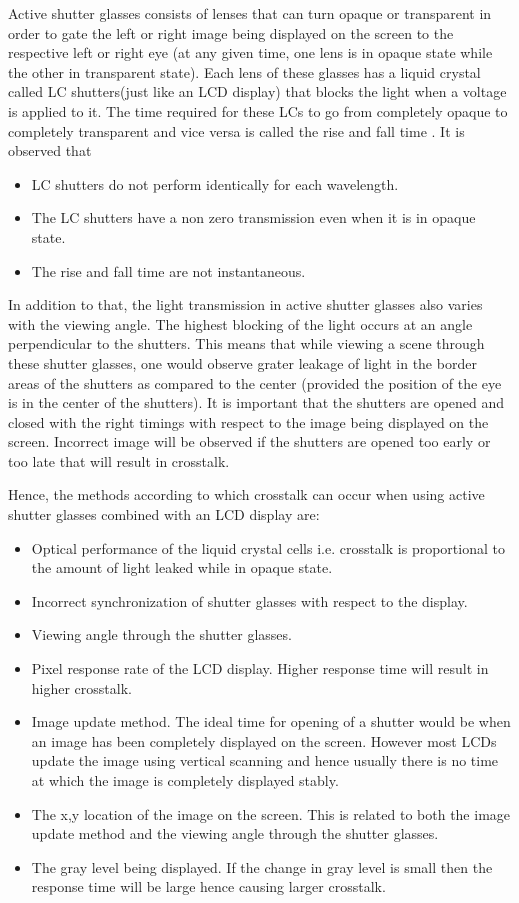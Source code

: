 Active shutter glasses consists of lenses that can turn opaque or transparent in order to gate the left or right image being displayed on the screen to the respective left or right eye (at any given time, one lens is in opaque state while the other in transparent state). Each lens of these glasses has a liquid crystal called LC shutters(just like an LCD display) that blocks the light when a voltage is applied to it. The time required for these LCs to go from completely opaque to completely transparent and vice versa is called the rise and fall time \cite{woods2012crosstalk}. It is observed that

\begin{itemize}
\item{LC shutters do not perform identically for each wavelength.}
\item{The LC shutters have a non zero transmission even when it is in opaque state.}
\item{The rise and fall time are not instantaneous.}
\end{itemize}

In addition to that, the light transmission in active shutter glasses also varies with the viewing angle. The highest blocking of the light occurs at an angle perpendicular to the shutters. This means that while viewing a scene through these shutter glasses, one would observe grater leakage of light in the border areas of the shutters as compared to the center (provided the position of the eye is in the center of the shutters). It is important that the shutters are opened and closed with the right timings with respect to the image being displayed on the screen. Incorrect image will be observed if the shutters are opened too early or too late that will result in crosstalk.

Hence, the methods according to which crosstalk can occur when using active shutter glasses combined with an LCD display are:
\begin{itemize}
	\item{Optical performance of the liquid crystal cells i.e. crosstalk is proportional to the amount of light leaked while in opaque state.}
	\item{Incorrect synchronization of shutter glasses with respect to the display.}
	\item{Viewing angle through the shutter glasses.}
	\item{Pixel response rate of the LCD display. Higher response time will result in higher crosstalk.}
	\item{Image update method. The ideal time for opening of a shutter would be when an image has been completely displayed on the screen. However most LCDs update the image using vertical scanning and hence usually there is no time at which the image is completely displayed stably.}
	\item{The x,y location of the image on the screen. This is related to both the image update method and the viewing angle through the shutter glasses.}
	\item{The gray level being displayed. If the change in gray level is small then the response time will be large hence causing larger crosstalk. }
\end{itemize}

